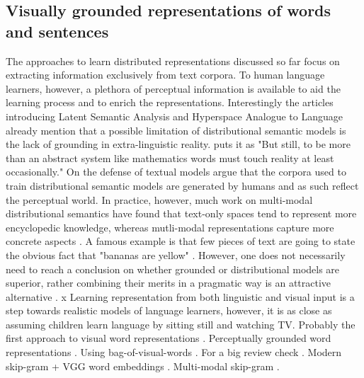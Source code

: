 \subsection{Visually grounded representations of words and sentences}
The approaches to learn distributed representations discussed so far focus on extracting information exclusively from text corpora. To human language learners, however, a plethora of perceptual information is available to aid the learning process and to enrich the representations. Interestingly the articles introducing Latent Semantic Analysis \cite{landauer1997solution} and Hyperspace Analogue to Language \cite{lund1996producing} already mention that a possible limitation of distributional semantic models is the lack of grounding in extra-linguistic reality. \cite{landauer1997solution} puts it as "But still, to be more than an abstract system like mathematics words must touch reality at least occasionally." On the defense of textual models \cite{louwerse2011symbol} argue that the corpora used to train distributional semantic models are generated by humans and as such reflect the perceptual world. In practice, however, much work on multi-modal distributional semantics have found that text-only spaces tend to represent more encyclopedic knowledge, whereas mutli-modal representations capture more concrete aspects \cite{andrews2009integrating,baroni2008concepts}. A famous example is that few pieces of text are going to state the obvious fact that "bananas are yellow" \cite{bruni2014multimodal}. However, one does not necessarily need to reach a conclusion on whether grounded or distributional models are superior, rather combining their merits in a pragmatic way is an attractive alternative \cite{riordan2011redundancy}. x
Learning representation from both linguistic and visual input is a step towards realistic models of language learners, however, it is as close as assuming children learn language by sitting still and watching TV.
Probably the first approach to visual word representations \cite{feng2010visual}. Perceptually grounded word representations \cite{bruni2012distributional}. Using bag-of-visual-words \cite{bruni2011distributional}. For a big review check \cite{bruni2014multimodal}. Modern skip-gram + VGG word embeddings \cite{kiela2014learning}. Multi-modal skip-gram \cite{lazaridou2015combining}.
